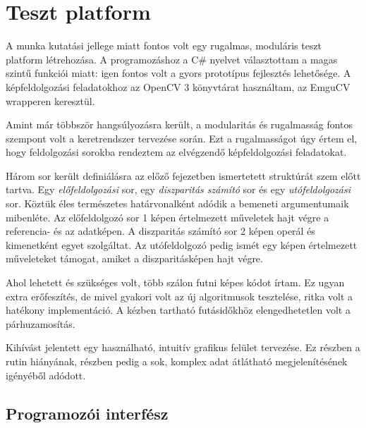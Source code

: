 \chapter{Teszt platform}\label{sect:Software}

A munka kutatási jellege miatt fontos volt egy rugalmas, moduláris teszt platform létrehozása.
A programozáshoz a C\# nyelvet választottam a magas szintű funkciói miatt: igen fontos volt a gyors prototípus fejlesztés lehetősége.
A képfeldolgozási feladatokhoz az OpenCV 3 könyvtárat használtam, az EmguCV wrapperen keresztül.

Amint már többször hangsúlyozásra került, a modularitás és rugalmasság fontos szempont volt a keretrendszer tervezése során.
Ezt a rugalmasságot úgy értem el, hogy feldolgozási sorokba rendeztem az elvégzendő képfeldolgozási feladatokat.

Három sor került definiálásra az előző fejezetben ismertetett struktúrát szem előtt tartva.
Egy \emph{előfeldolgozási} sor, egy \emph{diszparitás számító} sor és egy \emph{utófeldolgozási} sor.
Köztük éles természetes határvonalként adódik a bemeneti argumentumaik mibenléte.
Az előfeldolgozó sor 1 képen értelmezett műveletek hajt végre a referencia- és az adatképen.
A diszparitás számító sor 2 képen operál és kimenetként egyet szolgáltat.
Az utófeldolgozó pedig ismét egy képen értelmezett műveleteket támogat, amiket a diszparitásképen hajt végre.

Ahol lehetett és szükséges volt, több szálon futni képes kódot írtam.
Ez ugyan extra erőfeszítés, de mivel gyakori volt az új algoritmusok tesztelése, ritka volt a hatékony implementáció.
A kézben tartható futásidőkhöz elengedhetetlen volt a párhuzamosítás.

Kihívást jelentett egy használható, intuitív grafikus felület tervezése.
Ez részben a rutin hiányának, részben pedig a sok, komplex adat átlátható megjelenítésének igényéből adódott.

\section{Programozói interfész}\label{sect:ProgInterface}

